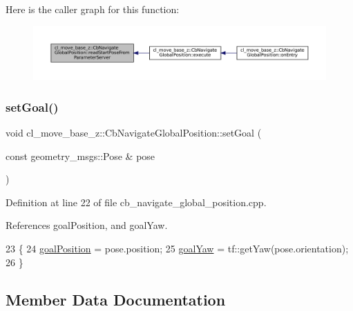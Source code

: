 Here is the caller graph for this function\+:
\nopagebreak
\begin{figure}[H]
\begin{center}
\leavevmode
\includegraphics[width=350pt]{classcl__move__base__z_1_1CbNavigateGlobalPosition_a868b25f238e3781c9a2e44b4e1502fcc_icgraph}
\end{center}
\end{figure}
\mbox{\label{classcl__move__base__z_1_1CbNavigateGlobalPosition_a3dc6072628c1e1cdded3d574b3a9766e}} 
\subsubsection{\texorpdfstring{set\+Goal()}{setGoal()}}
{\footnotesize\ttfamily void cl\+\_\+move\+\_\+base\+\_\+z\+::\+Cb\+Navigate\+Global\+Position\+::set\+Goal (\begin{DoxyParamCaption}\item[{const geometry\+\_\+msgs\+::\+Pose \&}]{pose }\end{DoxyParamCaption})}



Definition at line 22 of file cb\+\_\+navigate\+\_\+global\+\_\+position.\+cpp.



References goal\+Position, and goal\+Yaw.


\begin{DoxyCode}
23     \{
24         \hyperlink{classcl__move__base__z_1_1CbNavigateGlobalPosition_a51a0266fd9a63e99f26e88933529c559}{goalPosition} = pose.position;
25         \hyperlink{classcl__move__base__z_1_1CbNavigateGlobalPosition_a839900de7f664b27c9be189fadbaa003}{goalYaw} = tf::getYaw(pose.orientation);
26     \}
\end{DoxyCode}


\subsection{Member Data Documentation}
\mbox{\label{classcl__move__base__z_1_1CbNavigateGlobalPosition_a51a0266fd9a63e99f26e88933529c559}} 
